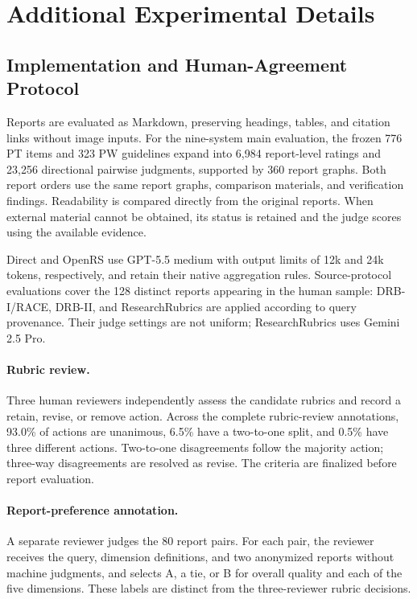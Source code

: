 \documentclass{article}
\begin{document}
\clearpage
\appendix
\raggedbottom
\section{Additional Experimental Details}
\label{app:experimental_details}

\subsection{Implementation and Human-Agreement Protocol}
\label{app:human_review}
Reports are evaluated as Markdown, preserving headings, tables, and citation links without image inputs. For the nine-system main evaluation, the frozen 776 PT items and 323 PW guidelines expand into 6,984 report-level ratings and 23,256 directional pairwise judgments, supported by 360 report graphs. Both report orders use the same report graphs, comparison materials, and verification findings. Readability is compared directly from the original reports. When external material cannot be obtained, its status is retained and the judge scores using the available evidence.

Direct and OpenRS use GPT-5.5 medium with output limits of 12k and 24k tokens, respectively, and retain their native aggregation rules. Source-protocol evaluations cover the 128 distinct reports appearing in the human sample: DRB-I/RACE, DRB-II, and ResearchRubrics are applied according to query provenance. Their judge settings are not uniform; ResearchRubrics uses Gemini 2.5 Pro. 

\paragraph{Rubric review.}
Three human reviewers independently assess the candidate rubrics and record a retain, revise, or remove action. Across the complete rubric-review annotations, 93.0\% of actions are unanimous, 6.5\% have a two-to-one split, and 0.5\% have three different actions. Two-to-one disagreements follow the majority action; three-way disagreements are resolved as revise. The criteria are finalized before report evaluation.

\paragraph{Report-preference annotation.}
A separate reviewer judges the 80 report pairs. For each pair, the reviewer receives the query, dimension definitions, and two anonymized reports without machine judgments, and selects A, a tie, or B for overall quality and each of the five dimensions. These labels are distinct from the three-reviewer rubric decisions.
\end{document}

